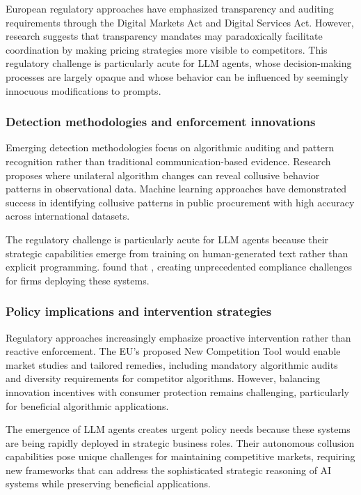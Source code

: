 European regulatory approaches have emphasized transparency and auditing requirements through the Digital Markets Act and Digital Services Act. However, research suggests that transparency mandates may paradoxically facilitate coordination by making pricing strategies more visible to competitors. This regulatory challenge is particularly acute for LLM agents, whose decision-making processes are largely opaque and whose behavior can be influenced by seemingly innocuous modifications to prompts.

\subsubsection*{Detection methodologies and enforcement innovations}

Emerging detection methodologies focus on algorithmic auditing and pattern recognition rather than traditional communication-based evidence. Research proposes  where unilateral algorithm changes can reveal collusive behavior patterns in observational data. Machine learning approaches have demonstrated success in identifying collusive patterns in public procurement with high accuracy across international datasets.

The regulatory challenge is particularly acute for LLM agents because their strategic capabilities emerge from training on human-generated text rather than explicit programming. \textcite[p.24]{fish_algorithmic_2025} found that , creating unprecedented compliance challenges for firms deploying these systems.

\subsubsection*{Policy implications and intervention strategies}

Regulatory approaches increasingly emphasize proactive intervention rather than reactive enforcement. The EU's proposed New Competition Tool would enable market studies and tailored remedies, including mandatory algorithmic audits and diversity requirements for competitor algorithms. However, balancing innovation incentives with consumer protection remains challenging, particularly for beneficial algorithmic applications.

The emergence of LLM agents creates urgent policy needs because these systems are being rapidly deployed in strategic business roles. Their autonomous collusion capabilities pose unique challenges for maintaining competitive markets, requiring new frameworks that can address the sophisticated strategic reasoning of AI systems while preserving beneficial applications.

